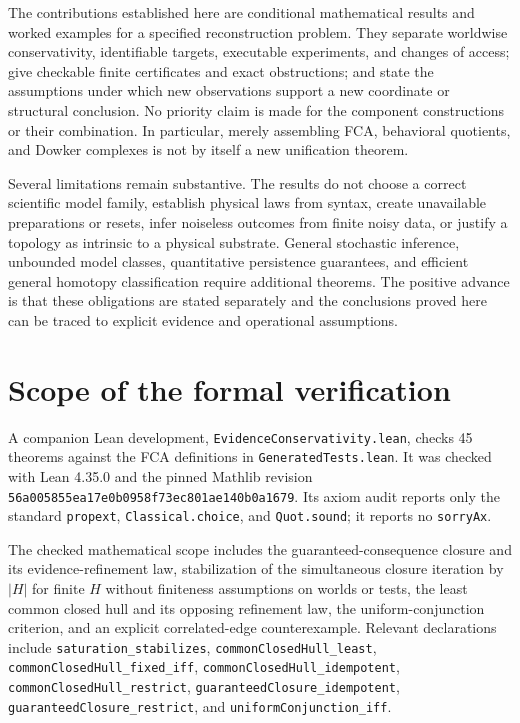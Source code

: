 \documentclass[11pt]{article}
\theoremstyle{definition}
\begin{document}
The contributions established here are conditional mathematical results
and worked examples for a specified reconstruction problem. They separate
worldwise conservativity, identifiable targets, executable experiments,
and changes of access; give checkable finite certificates and exact
obstructions; and state the assumptions under which new observations
support a new coordinate or structural conclusion. No priority claim is
made for the component constructions or their combination. In particular,
merely assembling FCA, behavioral quotients, and Dowker complexes is not
by itself a new unification theorem.

Several limitations remain substantive. The results do not choose a
correct scientific model family, establish physical laws from syntax,
create unavailable preparations or resets, infer noiseless outcomes from
finite noisy data, or justify a topology as intrinsic to a physical
substrate. General stochastic inference, unbounded model classes,
quantitative persistence guarantees, and efficient general homotopy
classification require additional theorems. The positive advance is that
these obligations are stated separately and the conclusions proved here
can be traced to explicit evidence and operational assumptions.



\section{Scope of the formal verification}
\label{sec:formal-scope}

A companion Lean development, \texttt{EvidenceConservativity.lean}, checks
45 theorems against the FCA definitions in \texttt{GeneratedTests.lean}.
It was checked with Lean 4.35.0 and the pinned Mathlib revision
\texttt{56a005855ea17e0b0958f73ec801ae140b0a1679}. Its axiom audit reports
only the standard \texttt{propext}, \texttt{Classical.choice}, and
\texttt{Quot.sound}; it reports no \texttt{sorryAx}.

The checked mathematical scope includes the guaranteed-consequence
closure and its evidence-refinement law, stabilization of the simultaneous
closure iteration by $|H|$ for finite $H$ without finiteness assumptions on
worlds or tests, the least common closed hull and its opposing refinement
law, the uniform-conjunction criterion, and an explicit correlated-edge
counterexample. Relevant declarations include
\texttt{saturation\_stabilizes},
\texttt{commonClosedHull\_least},
\texttt{commonClosedHull\_fixed\_iff},
\texttt{commonClosedHull\_idempotent},
\texttt{commonClosedHull\_restrict},
\texttt{guaranteedClosure\_idempotent},
\texttt{guaranteedClosure\_restrict}, and
\texttt{uniformConjunction\_iff}.
\end{document}
